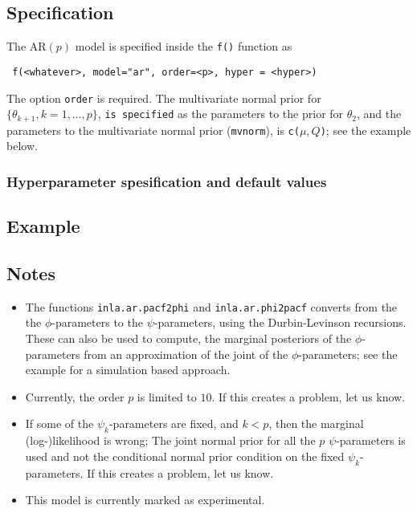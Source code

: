 \documentclass[a4paper,11pt]{article}
\begin{document}
\subsection*{Specification}

The AR$(p)$ model is specified inside the {\tt f()} function as
\begin{verbatim}
 f(<whatever>, model="ar", order=<p>, hyper = <hyper>)
\end{verbatim}
The option \texttt{order} is required. The multivariate normal prior
for $\{\theta_{k+1}, k=1, \ldots, p\}$, \texttt{is specified} as the
parameters to the prior for $\theta_{2}$, and the parameters to the
multivariate normal prior (\texttt{mvnorm}), is \texttt{c($\mu, Q$)};
see the example below.

\subsubsection*{Hyperparameter spesification and default values}


\subsection*{Example}



\subsection*{Notes}

\begin{itemize}
\item 
The functions \texttt{inla.ar.pacf2phi} and \texttt{inla.ar.phi2pacf}
converts from the the $\phi$-parameters to the $\psi$-parameters,
using the Durbin-Levinson recursions. These can also be used to
compute, the marginal posteriors of the $\phi$-parameters from an
approximation of the joint of the $\phi$-parameters; see the example
for a simulation based approach.

\item Currently, the order $p$ is limited to $10$. If this creates a
problem, let us know.

\item If some of the $\psi_{k}$-parameters are fixed, and $k < p$, then the
marginal (log-)likelihood is wrong; The joint normal prior for all the
$p$ $\psi$-parameters is used and not the conditional normal prior
condition on the fixed $\psi_{k}$-parameters. If this creates a
problem, let us know.

\item This model is currently marked as experimental.
\end{itemize}
\end{document}
